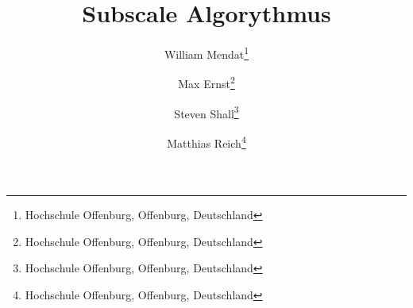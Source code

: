 \documentclass[]{lni}
\begin{document}
    \title[Ein Kurztitel]{Subscale Algorythmus}
    \author[William Mendat \and Max Ernst \and Steven Shall \and Matthias Reich]
    {William Mendat\footnote{Hochschule Offenburg, Offenburg,
        Deutschland } \and
    Max Ernst\footnote{Hochschule Offenburg, Offenburg,
        Deutschland } \and
    Steven Shall\footnote{Hochschule Offenburg, Offenburg,
        Deutschland } \and
    Matthias Reich\footnote{Hochschule Offenburg, Offenburg,
        Deutschland }}
    \maketitle

    
    
    
    
    
    
    


\end{document}
